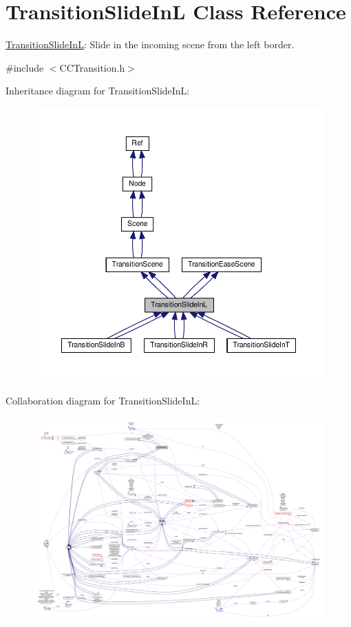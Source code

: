 \hypertarget{classTransitionSlideInL}{}\section{Transition\+Slide\+InL Class Reference}
\label{classTransitionSlideInL}


\hyperlink{classTransitionSlideInL}{Transition\+Slide\+InL}\+: Slide in the incoming scene from the left border.  




{\ttfamily \#include $<$C\+C\+Transition.\+h$>$}



Inheritance diagram for Transition\+Slide\+InL\+:
\nopagebreak
\begin{figure}[H]
\begin{center}
\leavevmode
\includegraphics[width=350pt]{classTransitionSlideInL__inherit__graph}
\end{center}
\end{figure}


Collaboration diagram for Transition\+Slide\+InL\+:
\nopagebreak
\begin{figure}[H]
\begin{center}
\leavevmode
\includegraphics[width=350pt]{classTransitionSlideInL__coll__graph}
\end{center}
\end{figure}
